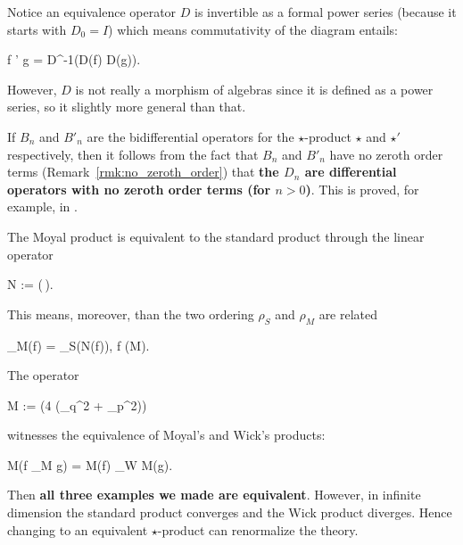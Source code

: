 \documentclass[main.tex]{subfiles}
\begin{document}
\begin{remark}
	Notice an equivalence operator $D$ is invertible as a formal power series (because it starts with $D_0 = I$) which means commutativity of the diagram entails:
	\begin{eqalign}
	\label{eq:equiv_operator}
		f \star' g = D^{-1}(D(f) \star D(g)).
	\end{eqalign}
	However, $D$ is not really a morphism of algebras since it is defined as a power series, so it slightly more general than that.
\end{remark}
\begin{remark}
	If $B_n$ and $B'_n$ are the bidifferential operators for the $\star$-product $\star$ and $\star'$ respectively, then it follows from the fact that $B_n$ and $B'_n$ have no zeroth order terms (Remark~\ref{rmk:no_zeroth_order}) that \textbf{the $D_n$ are differential operators with no zeroth order terms (for $n > 0$)}. This is proved, for example, in \cite[Theorem 2.22]{gutt1999equivalence}.
\end{remark}

\begin{example}
	The Moyal product is equivalent to the standard product through the linear operator
	\begin{eqalign}
		N := \exp\left(\,\right).
	\end{eqalign}
	This means, moreover, than the two ordering $\rho_S$ and $\rho_M$ are related
	\begin{eqalign}
		\rho_M(f) = \rho_S(N(f)), \quad \forall f \in \Cinfty(M).
	\end{eqalign}
\end{example}
\begin{example}
	The operator
	\begin{eqalign}
		M := \exp\left(\frac{\planck}4 (\partial_q^2 + \partial_p^2)\right)
	\end{eqalign}
	witnesses the equivalence of Moyal's and Wick's products:
	\begin{eqalign}
		M(f \star_M g) = M(f) \star_W M(g).
	\end{eqalign}
	Then \textbf{all three examples we made are equivalent}. However, in infinite dimension the standard product converges and the Wick product diverges. Hence changing to an equivalent $\star$-product can renormalize the theory.
\end{example}
\end{document}
